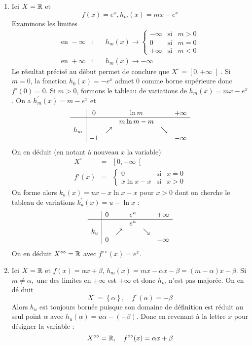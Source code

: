\begin{enumerate}
\item  Ici $X=\mathbb{R}$ et 
\[f(x)=e^{x} , h_{m}(x)=mx-e^{x}\]
Examinons les limites 
\begin{eqnarray*}
\text{en }-\infty  &:&\quad h_{m}(x)\rightarrow \left\{
\begin{array}{ccc}
-\infty  & \text{si} & m>0 \\
0 & \text{si} & m=0 \\
+\infty  & \text{si} & m<0
\end{array}
\right.  \\
\text{en }+\infty  &:&\quad h_{m}(x)\rightarrow -\infty
\end{eqnarray*}
Le r\'{e}sultat pr\'{e}cis\'{e} au début permet de conclure que $X^{\circ }=\left[ 0,+\infty \right[ $.\newline
Si $m=0$, la fonction $h_{0}(x)=-e^{x}$ admet $0$ comme borne sup\'{e}rieure donc $f^{\circ }(0)=0$.\newline
Si $m>0$, formons le tableau de variations de $h_{m}(x)=mx-e^{x}$. On a $h_{m}^{\prime }(x)=m-e^{x}$ et
\[
\begin{array}{c|ccccc}
& 0 &  & \ln m &  & +\infty  \\
\hline
&  &  & m\ln m-m &  &  \\
h_{m} &  & \nearrow  &  & \searrow  &  \\
& -1 &  &  &  & -\infty
\end{array}
\]
On en d\'{e}duit (en notant \`{a} nouveau $x$ la variable)
\begin{eqnarray*}
X^{\circ } &=&\left[ 0,+\infty \right[  \\
f^{\circ }(x) &=&\left\{
\begin{array}{ccc}
0 & \text{si} & x=0 \\
x\ln x-x & \text{si} & x>0
\end{array}
\right.
\end{eqnarray*}
On forme alors $k_{u}(x)=ux-x\ln x-x$ pour $x>0$ dont on cherche le tableau
de variations $k_{u}^{\prime }(x)=u-\ln x$ :
\[
\begin{array}{c|ccccc}
& 0 &  & e^{u} &  & +\infty  \\
\hline
&  &  & e^{u} &  &  \\
k_{u} &  & \nearrow  &  & \searrow  &  \\
& 0 &  &  &  & -\infty
\end{array}
\]
On en d\'{e}duit $X^{\circ \circ }=\mathbb{R}$ avec $f^{\circ \circ
}(x)=e^{x}$.

\item  Ici $X=\mathbb{R}$ et $f(x)=\alpha x+\beta $, $h_{m}(x)=mx-\alpha
x-\beta =(m-\alpha )x-\beta $. Si $m\neq \alpha ,$ une des limites en $\pm
\infty $ est $+\infty $ et donc $h_{m}$ n'est pas major\'{e}e$.$ On en d\'{e}%
duit
\[
X^{\circ }=\left\{ \alpha \right\} ,\quad f^{\circ }(\alpha)=-\beta
\]
Alors $h_{u}$ est toujours born\'{e}e puisque son domaine de d\'{e}finition
est r\'{e}duit au seul point $\alpha $ avec $h_{u}(\alpha )=u\alpha -(-\beta
)$. Donc en revenant \`{a} la lettre $x$ pour d\'{e}signer la variable :
\[
X^{\circ \circ }=\mathbb{R},\quad f^{\circ \circ }(x)=\alpha x+\beta
\]



\end{enumerate}
